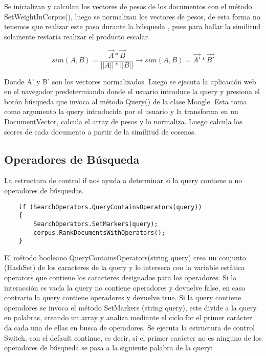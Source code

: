 \documentclass[a4paper,12pt,twocolumn]{article}
\begin{document}
\begin{enumerate}
Se inicializan y calculan los vectores de pesos de los documentos con el método
SetWeightInCorpus(), luego se normalizan los vectores de pesos, de esta forma no
tenemos que realizar este paso durante la búsqueda , pues para hallar la similitud solamente restaría realizar el producto escalar.

\begin{center}
    \begin{equation}
    sim(A, B) = \frac{\overrightarrow{A} * \overrightarrow{B}}{||A|| * ||B||}  \rightarrow sim(A, B) = \overrightarrow{A'} * \overrightarrow{B'}
    \tag*{Producto Vectorial}
    \end{equation}
    \end{center}

Donde A' y B' son los vectores normalizados.
Luego se ejecuta la aplicación web en el navegador predetermiando donde el usuario introduce la query y presiona el botón
búsqueda que invoca al método Query() de la clase Moogle. Esta toma como argumento la
query introducida por el usuario y la transforma en un DocumentVector, calcula el array de pesos
y lo normaliza. Luego calcula los scores de cada documento a partir de la similitud de cosenos.

\subsection{Operadores de Búsqueda}
La estructura de control if nos ayuda a determinar si la query contiene o no operadores de
búsquedas.

\begin{verbatim}
    if (SearchOperators.QueryContainsOperators(query))
    {
        SearchOperators.SetMarkers(query);
        corpus.RankDocumentsWithOperators();
    }

\end{verbatim}


El método booleano QueryContainsOperators(string query) crea un conjunto (HashSet) de los
caracteres de la query y lo interseca con la variable estática operators que contiene los
caracteres designados para los operadores. Si la interacción es vacía la query no contiene
operadores y devuelve false, en caso contrario la query contiene operadores y devuelve true.
Si la query contiene operadores se invoca el método SetMarkers (string query), este divide a la
query en palabras, creando un array y analiza mediante el ciclo for el primer carácter da cada
una de ellas en busca de operadores.
Se ejecuta la estructura de control Switch, con el default continue, es decir, si el primer carácter
no es ninguno de los operadores de búsqueda se pasa a la siguiente palabra de la query:


\end{enumerate}
\end{document}
